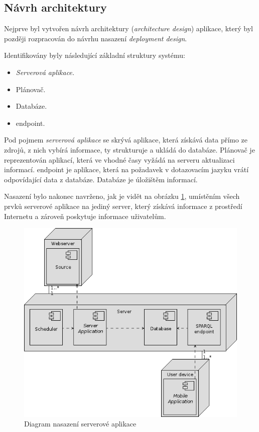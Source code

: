 \subsection{Návrh architektury}
Nejprve byl vytvořen návrh architektury (\textit{architecture design}) aplikace, který byl později rozpracován do návrhu nasazení \textit{deployment design}.

Identifikovány byly následující základní struktury systému:
\begin{itemize}
 \item \textit{Serverová aplikace.}
 \item Plánovač.
 \item Databáze.
 \item {} endpoint.
\end{itemize}
Pod pojmem \textit{serverová aplikace} se skrývá aplikace, která získává data přímo ze zdrojů, z nich vybírá informace, ty strukturuje a ukládá do databáze. Plánovač je reprezentován aplikací, která ve vhodné časy vyžádá na serveru aktualizaci informací.  endpoint je aplikace, která na požadavek v dotazovacím jazyku vrátí odpovídající data z databáze. Databáze je úložištěm informací.

Nasazení bylo nakonec navrženo, jak je vidět na obrázku \ref{fig:server:deployment}, umístěním všech prvků serverové aplikace na jediný server, který získává informace z prostředí Internetu a zároveň poskytuje informace uživatelům.
\begin{figure}[h]
 \centering
 \includegraphics{./figures/deployment-s.png}
 \caption{Diagram nasazení serverové aplikace}
 \label{fig:server:deployment}
\end{figure}


